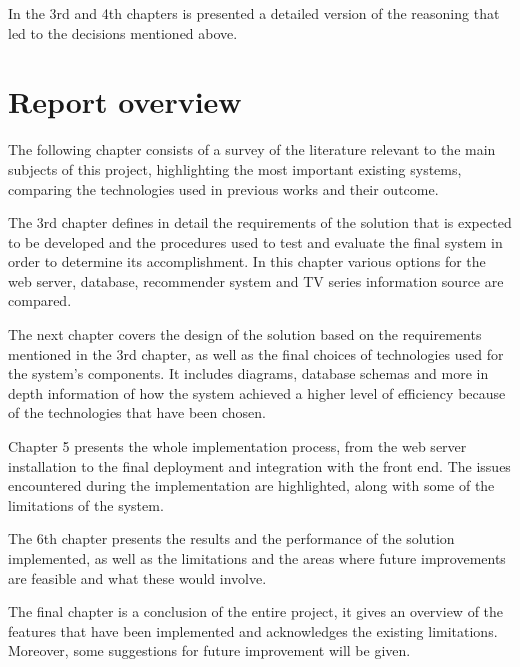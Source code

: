 In the 3rd and 4th chapters is presented a detailed version of the reasoning that led to the decisions mentioned above.

\section{Report overview}

The following chapter consists of a survey of the literature relevant to the main subjects of this project, highlighting the most important existing systems, comparing the technologies used in previous works and their outcome.

The 3rd chapter defines in detail the requirements of the solution that is expected to be developed and the procedures used to test and evaluate the final system in order to determine its accomplishment. In this chapter various options for the web server, database, recommender system and TV series information source are compared.

The next chapter covers the design of the solution based on the requirements mentioned in the 3rd chapter, as well as the final choices of technologies used for the system's components. It includes diagrams, database schemas and more in depth information of how the system achieved a higher level of efficiency because of the technologies that have been chosen.

Chapter 5 presents the whole implementation process, from the web server installation to the final deployment and integration with the front end. The issues encountered during the implementation are highlighted, along with some of the limitations of the system.

The 6th chapter presents the results and the performance of the solution implemented, as well as the limitations and the areas where future improvements are feasible and what these would involve.

The final chapter is a conclusion of the entire project, it gives an overview of the features that have been implemented and acknowledges the existing limitations. Moreover, some suggestions for future improvement will be given.